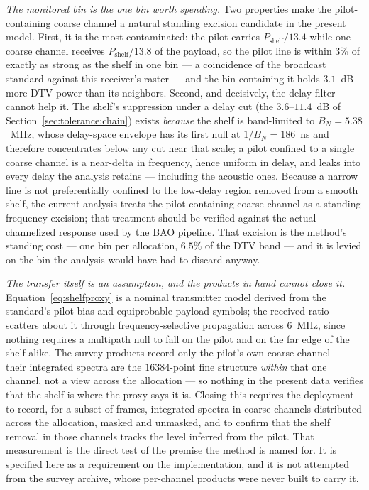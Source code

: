 \textit{The monitored bin is the one bin worth spending.} Two properties make the pilot-containing coarse channel a natural standing excision candidate in the present model. First, it is the most contaminated: the pilot carries $P_{\text{shelf}}/13.4$ while one coarse channel receives $P_{\text{shelf}}/13.8$ of the payload, so the pilot line is within $3\%$ of exactly as strong as the shelf in one bin --- a coincidence of the broadcast standard against this receiver's raster --- and the bin containing it holds $3.1$~dB more DTV power than its neighbors. Second, and decisively, the delay filter cannot help it. The shelf's suppression under a delay cut (the $3.6$--$11.4$~dB of Section~\ref{sec:tolerance:chain}) exists \emph{because} the shelf is band-limited to $B_N = 5.38$~MHz, whose delay-space envelope has its first null at $1/B_N = 186$~ns and therefore concentrates below any cut near that scale; a pilot confined to a single coarse channel is a near-delta in frequency, hence uniform in delay, and leaks into every delay the analysis retains --- including the acoustic ones. Because a narrow line is not preferentially confined to the low-delay region removed from a smooth shelf, the current analysis treats the pilot-containing coarse channel as a standing frequency excision; that treatment should be verified against the actual channelized response used by the BAO pipeline. That excision is the method's standing cost --- one bin per allocation, $6.5\%$ of the DTV band --- and it is levied on the bin the analysis would have had to discard anyway.

\textit{The transfer itself is an assumption, and the products in hand cannot close it.} Equation~\eqref{eq:shelfproxy} is a nominal transmitter model derived from the standard's pilot bias and equiprobable payload symbols; the received ratio scatters about it through frequency-selective propagation across $6$~MHz, since nothing requires a multipath null to fall on the pilot and on the far edge of the shelf alike. The survey products record only the pilot's own coarse channel --- their integrated spectra are the $16384$-point fine structure \emph{within} that one channel, not a view across the allocation --- so nothing in the present data verifies that the shelf is where the proxy says it is. Closing this requires the deployment to record, for a subset of frames, integrated spectra in coarse channels distributed across the allocation, masked and unmasked, and to confirm that the shelf removal in those channels tracks the level inferred from the pilot. That measurement is the direct test of the premise the method is named for. It is specified here as a requirement on the implementation, and it is not attempted from the survey archive, whose per-channel products were never built to carry it.

